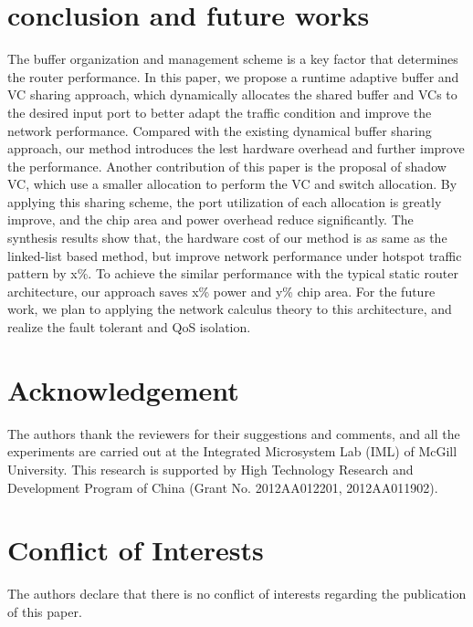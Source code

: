 \documentclass[10pt,conference]{IEEEtran}
\begin{document}
\section{conclusion and future works}\label{conc}
The buffer organization and management scheme is a key factor that determines the router performance. In this paper, we propose a runtime adaptive buffer and VC sharing approach, which dynamically allocates the shared buffer and VCs to the desired input port to better adapt the traffic condition and improve the network performance. Compared with the existing dynamical buffer sharing approach, our method introduces the lest hardware overhead and further improve the performance. Another contribution of this paper is the proposal of shadow VC, which use a smaller allocation to perform the VC and switch allocation. By applying this sharing scheme, the port utilization of each allocation is greatly improve, and the chip area and power overhead reduce significantly. The synthesis results show that, the hardware cost of our method is as same as the linked-list based method, but improve network performance under hotspot traffic pattern by x\%. To achieve the similar performance with the typical static router architecture, our approach saves x\% power and y\% chip area. For the future work, we plan to applying the network calculus theory to this architecture, and realize the fault tolerant and QoS isolation.

\section*{Acknowledgement}
The authors thank the reviewers for their suggestions and comments, and all the experiments are carried out at the Integrated Microsystem Lab (IML) of McGill University. This research is supported by High Technology Research and Development Program of China (Grant No. 2012AA012201, 2012AA011902).

\section*{Conflict of Interests}
The authors declare that there is no conflict of interests regarding the publication of this paper.



\end{document}
